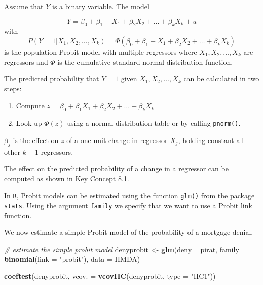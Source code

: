 \documentclass[]{book}
\newenvironment{Shaded}{\begin{snugshade}}{\end{snugshade}}
\newcommand{\KeywordTok}[1]{\textcolor[rgb]{0.13,0.29,0.53}{\textbf{#1}}}
\newcommand{\DataTypeTok}[1]{\textcolor[rgb]{0.13,0.29,0.53}{#1}}
\newcommand{\StringTok}[1]{\textcolor[rgb]{0.31,0.60,0.02}{#1}}
\newcommand{\CommentTok}[1]{\textcolor[rgb]{0.56,0.35,0.01}{\textit{#1}}}
\newcommand{\OperatorTok}[1]{\textcolor[rgb]{0.81,0.36,0.00}{\textbf{#1}}}
\newcommand{\NormalTok}[1]{#1}
\theoremstyle{definition}
\theoremstyle{definition}
\theoremstyle{definition}
\theoremstyle{remark}
\begin{document}
\begin{keyconcepts}{11.2}
Assume that $Y$ is a binary variable. The model

$$ Y= \beta_0 + \beta_1 + X_1 + \beta_2 X_2 + \dots + \beta_k X_k + u $$
with
$$P(Y = 1 \vert X_1, X_2, \dots ,X_k) = \Phi(\beta_0 + \beta_1 + X_1 + \beta_2 X_2 + \dots + \beta_k X_k)$$
is the population Probit model with multiple regressors where $X_1, X_2, \dots, X_k$ are regressors and $\Phi$ is the cumulative standard normal distribution function.\newline

The predicted probability that $Y=1$ given $X_1, X_2, \dots, X_k$ can be calculated in two steps:\newline

\begin{enumerate}
\item Compute $z = \beta_0 + \beta_1 X_1 + \beta_2 X_2 + \dots + \beta_k X_k$
\item Look up $\Phi(z)$ using a normal distribution table or by calling \texttt{pnorm()}.
\end{enumerate}\vspace{0.5cm}

$\beta_j$ is the effect on $z$ of a one unit change in regressor $X_j$, holding constant all other $k-1$ regressors.\newline

The effect on the predicted probability of a change in a regressor can be computed as shown in Key Concept 8.1.\newline

In \texttt{R}, Probit models can be estimated using the function \texttt{glm()} from the package \texttt{stats}. Using the argument \texttt{family} we specify that we want to use a Probit link function.
\end{keyconcepts}

We now estimate a simple Probit model of the probability of a mortgage
denial.

\begin{Shaded}
\begin{Highlighting}[]
\CommentTok{# estimate the simple probit model}
\NormalTok{denyprobit <-}\StringTok{ }\KeywordTok{glm}\NormalTok{(deny }\OperatorTok{~}\StringTok{ }\NormalTok{pirat, }
                \DataTypeTok{family =} \KeywordTok{binomial}\NormalTok{(}\DataTypeTok{link =} \StringTok{"probit"}\NormalTok{), }
                \DataTypeTok{data =}\NormalTok{ HMDA)}

\KeywordTok{coeftest}\NormalTok{(denyprobit, }\DataTypeTok{vcov. =} \KeywordTok{vcovHC}\NormalTok{(denyprobit, }\DataTypeTok{type =} \StringTok{"HC1"}\NormalTok{))}
\end{Highlighting}
\end{Shaded}
\end{document}
